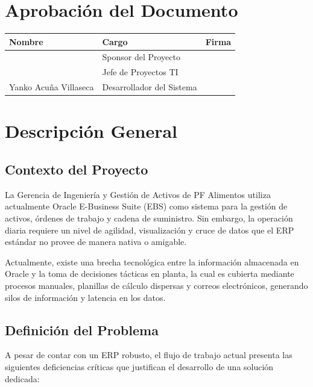 \documentclass[11pt, letterpaper]{article}
\begin{document}
\vspace{2cm}

\section*{Aprobación del Documento}
\begin{center}
\renewcommand{\arraystretch}{1.5}
\begin{tabular}{|L{5cm}|L{5cm}|C{4cm}|}
\hline
{} \textbf{Nombre} & \textbf{Cargo} & \textbf{Firma} \\ \hline
& Sponsor del Proyecto & \\ \hline
& Jefe de Proyectos TI & \\ \hline
Yanko Acuña Villaseca & Desarrollador del Sistema & \\ \hline
\end{tabular}
\end{center}

\newpage
\tableofcontents
\newpage

\section{Descripción General}

\subsection{Contexto del Proyecto}
La Gerencia de Ingeniería y Gestión de Activos de PF Alimentos utiliza actualmente Oracle E-Business Suite (EBS) como sistema para la gestión de activos, órdenes de trabajo y cadena de suministro. Sin embargo, la operación diaria requiere un nivel de agilidad, visualización y cruce de datos que el ERP estándar no provee de manera nativa o amigable.

Actualmente, existe una brecha tecnológica entre la información almacenada en Oracle y la toma de decisiones tácticas en planta, la cual es cubierta mediante procesos manuales, planillas de cálculo dispersas y correos electrónicos, generando silos de información y latencia en los datos.

\subsection{Definición del Problema}
A pesar de contar con un ERP robusto, el flujo de trabajo actual presenta las siguientes deficiencias críticas que justifican el desarrollo de una solución dedicada:
\end{document}
